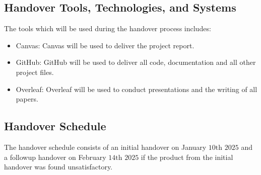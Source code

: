 \subsection{Handover Tools, Technologies, and Systems}

The tools which will be used during the handover process includes:
\begin{itemize}
    \item Canvas: Canvas will be used to deliver the project report.
    \item GitHub: GitHub will be used to deliver all code, documentation and all other project files.
    \item Overleaf: Overleaf will be used to conduct presentations and the writing of all papers.
\end{itemize}


\begin{comment}
We leverage the following tools, technologies, and systems during our handover process:

\begin{itemize}
\item \textbf{Inventory Management Tools:} We utilize [Tool/Platform Name, version] to catalogue and track all project deliverables for handover, which can be downloaded from [source].
\item \textbf{Presentation Tools:} If necessary, we use [Tool/Platform Name, version] to conduct presentations or demonstrations, and it can be downloaded from [source].
\end{itemize}

Please install the correct version numbers as specified for consistency and compatibility.
\end{comment}

\subsection{Handover Schedule}

The handover schedule consists of an initial handover on January $10\text{th}$ $2025$ and a followup handover on February $14\text{th}$ $2025$ if the product from the initial handover was found unsatisfactory.



